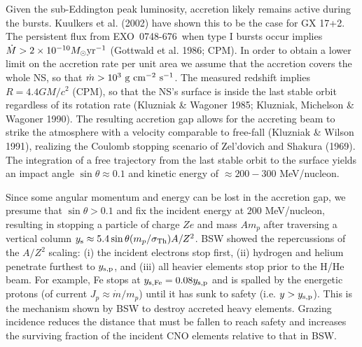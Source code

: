 \documentclass[iop,apjl,letterpaper]{emulateapj}
\newcommand{\EXO}{\mbox{EXO 0748-676}}
\begin{document}
Given the sub-Eddington peak luminosity, accretion likely remains
active during the bursts.  Kuulkers et al. (2002) have shown this to
be the case for GX 17+2.  The persistent flux from \EXO \ when type I
bursts occur implies $\dot M> 2\times 10^{-10} M_\odot {\rm yr^{-1}}$
(Gottwald et al. 1986; CPM).  In order to obtain a lower limit on the
accretion rate per unit area we assume that the accretion covers the
whole NS, so that $\dot m> 10^3 {\rm \ g \ cm^{-2}\ s^{-1}}$.  The
measured redshift implies $R=4.4GM/c^2$ (CPM), so that the NS's
surface is inside the last stable orbit regardless of its rotation
rate (Kluzniak \& Wagoner 1985; Kluzniak, Michelson \& Wagoner
1990). The resulting accretion gap allows for the accreting beam to
strike the atmosphere with a velocity comparable to free-fall
(Kluzniak \& Wilson 1991), realizing the Coulomb stopping scenario of
Zel'dovich and Shakura (1969). The integration of a free trajectory
from the last stable orbit to the surface yields an impact angle
$\sin\theta\approx 0.1$ and kinetic energy of $\approx 200-300$
MeV/nucleon.

Since some angular momentum and energy can be lost in the accretion
gap, we presume that $\sin\theta>0.1$ and fix the incident energy at
$200$ MeV/nucleon, resulting in stopping a particle of charge $Ze$ and
mass $Am_p$ after traversing a vertical column $y_{\rm s}\approx
5.4\sin\theta (m_p/\sigma_{\rm Th})A/Z^2$. BSW showed the
repercussions of the $A/Z^2$ scaling: (i) the incident electrons stop
first, (ii) hydrogen and helium penetrate furthest to $y_{\rm s,p}$,
and (iii) all heavier elements stop prior to the H/He beam. For
example, Fe stops at $y_{\rm s,Fe}=0.08y_{\rm s,p}$ and is spalled by
the energetic protons (of current $J_p\approx \dot m/m_p$) until it
has sunk to safety (i.e.  $y>y_{\rm s,p}$). This is the mechanism
shown by BSW to destroy accreted heavy elements. Grazing incidence
reduces the distance that must be fallen to reach safety and increases
the surviving fraction of the incident CNO elements relative to that
in BSW.
\end{document}
